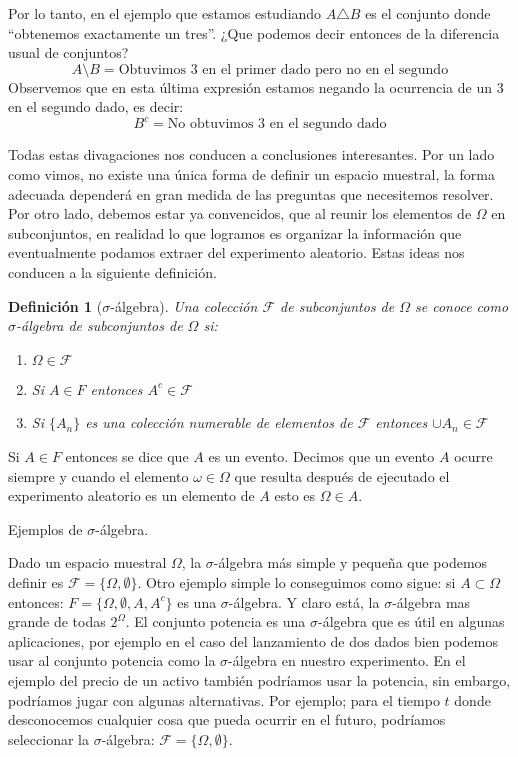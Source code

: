 \documentclass[14pt]{extreport}
\newtheorem{definition}{Definición}[chapter]
\newcounter{ejemplo}[chapter]
\begin{document}
Por lo tanto, en el ejemplo que estamos estudiando $A \triangle B$ es el conjunto donde ``obtenemos exactamente un tres''. ¿Que podemos decir entonces de la diferencia
usual de conjuntos?
$$
  A \setminus B = \text{Obtuvimos 3 en el primer dado pero no en el segundo}
$$
Observemos que en esta última expresión estamos negando la ocurrencia de un 3 en el segundo dado, es decir:
$$
  B^c = \text{No obtuvimos 3 en el segundo dado}
$$

Todas estas divagaciones nos conducen a conclusiones interesantes. Por un lado como vimos, no existe una única forma de definir un espacio muestral, la forma adecuada dependerá en gran medida de las preguntas que necesitemos resolver. Por otro lado, debemos estar ya convencidos, que al reunir los elementos de $\Omega$ en subconjuntos, en realidad lo que logramos es organizar la información que eventualmente podamos extraer del experimento aleatorio. Estas ideas nos conducen a la siguiente definición.
\begin{definition}[$\sigma$-álgebra]
  Una colección $\mathcal{F}$ de subconjuntos de $\Omega$ se conoce como $\sigma$-álgebra de subconjuntos de $\Omega$ si:
  \begin{enumerate}
    \item $\Omega \in \mathcal{F}$
    \item Si $A \in F$ entonces $A^c \in \mathcal{F}$
    \item Si $\{A_n\}$ es una colección numerable de elementos de $\mathcal{F}$ entonces $\cup A_n \in \mathcal{F}$
  \end{enumerate}
\end{definition}

Si $A \in F$ entonces se dice que $A$ es un evento. Decimos que un evento $A$ ocurre siempre y cuando el elemento $\omega \in \Omega$ que resulta después de ejecutado el experimento aleatorio es un elemento de $A$ esto es $\Omega \in A$.

Ejemplos de $\sigma$-álgebra.

Dado un espacio muestral $\Omega$, la $\sigma$-álgebra más simple y pequeña que podemos definir es $\mathcal{F}=\{\Omega, \emptyset\}$. Otro ejemplo simple lo conseguimos como sigue: si $A \subset \Omega$ entonces: $F = \{\Omega,\emptyset, A, A^c\}$ es una $\sigma$-álgebra. Y claro está, la $\sigma$-álgebra mas grande de todas $2^\Omega$. El conjunto potencia es una $\sigma$-álgebra que es útil en algunas aplicaciones, por ejemplo en el caso del lanzamiento de dos dados bien podemos usar al conjunto potencia como la $\sigma$-álgebra en nuestro experimento. En el ejemplo del precio de un activo también podríamos usar la potencia, sin embargo, podríamos jugar con algunas alternativas. Por ejemplo; para el tiempo $t$ donde desconocemos cualquier cosa que pueda ocurrir en el futuro, podríamos seleccionar la $\sigma$-álgebra: $\mathcal{F} = \{\Omega,\emptyset\}$.
\end{document}
